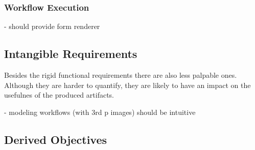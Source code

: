 
  \subsubsection{Workflow Execution} %
    \label{ssub:workflow_execution}

        - should provide form renderer

\subsection{Intangible Requirements} %
  \label{sub:intangible_requirements}

  Besides the rigid functional requirements there are also less palpable ones. Although they are harder to quantify, they are likely to have an impact on the usefulnes of the produced artifacts.

    - modeling workflows (with 3rd p images) should be intuitive


\subsection{Derived Objectives} %
  \label{sub:derived_objectives}

